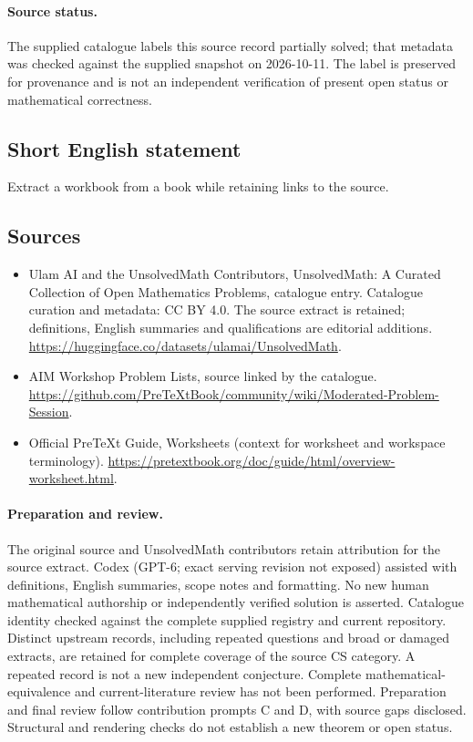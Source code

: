 \documentclass[11pt]{article}
\begin{document}
\paragraph{Source status.}
The supplied catalogue labels this source record partially solved; that metadata was checked against the supplied snapshot on 2026-10-11. The label is preserved for provenance and is not an independent verification of present open status or mathematical correctness.
\subsection{Short English statement}
Extract a workbook from a book while retaining links to the source.
\subsection{Sources}
\begin{itemize}
\item[\hypertarget{source:statement:1}{S1}] Ulam AI and the UnsolvedMath Contributors, UnsolvedMath: A Curated Collection of Open Mathematics Problems, catalogue entry. Catalogue curation and metadata: CC BY 4.0. The source extract is retained; definitions, English summaries and qualifications are editorial additions.
\url{https://huggingface.co/datasets/ulamai/UnsolvedMath}.
\item[\hypertarget{source:statement:2}{S2}] AIM Workshop Problem Lists, source linked by the catalogue.
\url{https://github.com/PreTeXtBook/community/wiki/Moderated-Problem-Session}.
\item[\hypertarget{source:statement:3}{S3}] Official PreTeXt Guide, Worksheets (context for worksheet and workspace terminology).
\url{https://pretextbook.org/doc/guide/html/overview-worksheet.html}.
\end{itemize}
\paragraph{Preparation and review.}
The original source and UnsolvedMath contributors retain attribution for the source extract. Codex (GPT-6; exact serving revision not exposed) assisted with definitions, English summaries, scope notes and formatting. No new human mathematical authorship or independently verified solution is asserted. Catalogue identity checked against the complete supplied registry and current repository. Distinct upstream records, including repeated questions and broad or damaged extracts, are retained for complete coverage of the source CS category. A repeated record is not a new independent conjecture. Complete mathematical-equivalence and current-literature review has not been performed. Preparation and final review follow contribution prompts C and D, with source gaps disclosed. Structural and rendering checks do not establish a new theorem or open status.
\label{end:statement}
\end{document}
